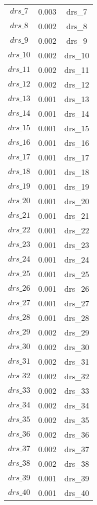 \begin{center}
\begin{longtable}{ccc}
$drs\_7$ 	 & 	 0.003 	 & 	 drs\_7\\
$drs\_8$ 	 & 	 0.002 	 & 	 drs\_8\\
$drs\_9$ 	 & 	 0.002 	 & 	 drs\_9\\
$drs\_10$ 	 & 	 0.002 	 & 	 drs\_10\\
$drs\_11$ 	 & 	 0.002 	 & 	 drs\_11\\
$drs\_12$ 	 & 	 0.002 	 & 	 drs\_12\\
$drs\_13$ 	 & 	 0.001 	 & 	 drs\_13\\
$drs\_14$ 	 & 	 0.001 	 & 	 drs\_14\\
$drs\_15$ 	 & 	 0.001 	 & 	 drs\_15\\
$drs\_16$ 	 & 	 0.001 	 & 	 drs\_16\\
$drs\_17$ 	 & 	 0.001 	 & 	 drs\_17\\
$drs\_18$ 	 & 	 0.001 	 & 	 drs\_18\\
$drs\_19$ 	 & 	 0.001 	 & 	 drs\_19\\
$drs\_20$ 	 & 	 0.001 	 & 	 drs\_20\\
$drs\_21$ 	 & 	 0.001 	 & 	 drs\_21\\
$drs\_22$ 	 & 	 0.001 	 & 	 drs\_22\\
$drs\_23$ 	 & 	 0.001 	 & 	 drs\_23\\
$drs\_24$ 	 & 	 0.001 	 & 	 drs\_24\\
$drs\_25$ 	 & 	 0.001 	 & 	 drs\_25\\
$drs\_26$ 	 & 	 0.001 	 & 	 drs\_26\\
$drs\_27$ 	 & 	 0.001 	 & 	 drs\_27\\
$drs\_28$ 	 & 	 0.001 	 & 	 drs\_28\\
$drs\_29$ 	 & 	 0.002 	 & 	 drs\_29\\
$drs\_30$ 	 & 	 0.002 	 & 	 drs\_30\\
$drs\_31$ 	 & 	 0.002 	 & 	 drs\_31\\
$drs\_32$ 	 & 	 0.002 	 & 	 drs\_32\\
$drs\_33$ 	 & 	 0.002 	 & 	 drs\_33\\
$drs\_34$ 	 & 	 0.002 	 & 	 drs\_34\\
$drs\_35$ 	 & 	 0.002 	 & 	 drs\_35\\
$drs\_36$ 	 & 	 0.002 	 & 	 drs\_36\\
$drs\_37$ 	 & 	 0.002 	 & 	 drs\_37\\
$drs\_38$ 	 & 	 0.002 	 & 	 drs\_38\\
$drs\_39$ 	 & 	 0.001 	 & 	 drs\_39\\
$drs\_40$ 	 & 	 0.001 	 & 	 drs\_40\\

\end{longtable}
\end{center}
